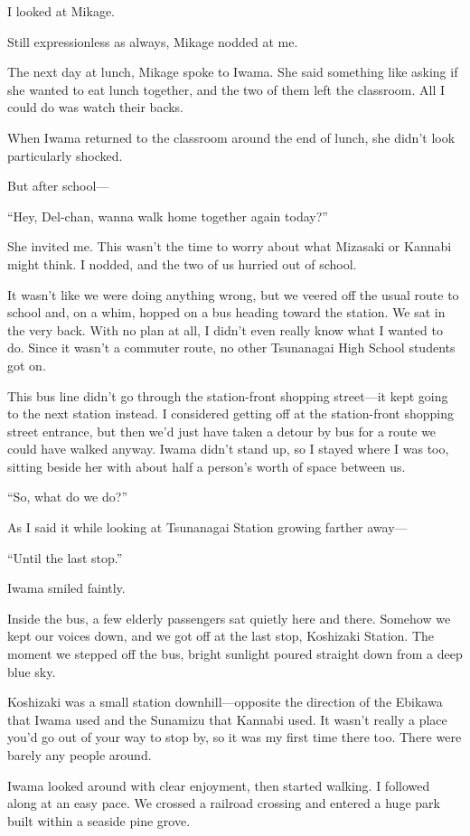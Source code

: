 \documentclass[
    a4paper,
    12pt,
    twoside,
    openany,
    UTF8,
    fontset=windows
]{ctexbook}
\begin{document}
I looked at Mikage.

Still expressionless as always, Mikage nodded at me.

The next day at lunch, Mikage spoke to Iwama. She said something like asking if she wanted to eat lunch together, and the two of them left the classroom. All I could do was watch their backs.

When Iwama returned to the classroom around the end of lunch, she didn't look particularly shocked.

But after school---

``Hey, Del-chan, wanna walk home together again today?''

She invited me. This wasn't the time to worry about what Mizasaki or Kannabi might think. I nodded, and the two of us hurried out of school.

It wasn't like we were doing anything wrong, but we veered off the usual route to school and, on a whim, hopped on a bus heading toward the station. We sat in the very back. With no plan at all, I didn't even really know what I wanted to do. Since it wasn't a commuter route, no other Tsunanagai High School students got on.

This bus line didn't go through the station-front shopping street---it kept going to the next station instead. I considered getting off at the station-front shopping street entrance, but then we'd just have taken a detour by bus for a route we could have walked anyway. Iwama didn't stand up, so I stayed where I was too, sitting beside her with about half a person's worth of space between us.

``So, what do we do?''

As I said it while looking at Tsunanagai Station growing farther away---

``Until the last stop.''

Iwama smiled faintly.

Inside the bus, a few elderly passengers sat quietly here and there. Somehow we kept our voices down, and we got off at the last stop, Koshizaki Station. The moment we stepped off the bus, bright sunlight poured straight down from a deep blue sky.

Koshizaki was a small station downhill---opposite the direction of the Ebikawa that Iwama used and the Sunamizu that Kannabi used. It wasn't really a place you'd go out of your way to stop by, so it was my first time there too. There were barely any people around.

Iwama looked around with clear enjoyment, then started walking. I followed along at an easy pace. We crossed a railroad crossing and entered a huge park built within a seaside pine grove.
\end{document}
